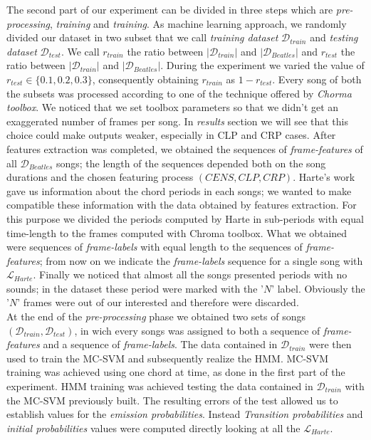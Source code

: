 The second part of our experiment can be divided in three steps which are \textit{pre-processing}, \textit{training} and \textit{training}. As machine learning approach, we randomly divided our dataset in two subset that we call \textit{training dataset} $\mathcal{D}_{train}$ and \textit{testing dataset}  $\mathcal{D}_{test}$. We call $r_{train}$ the ratio between $|\mathcal{D}_{train}|$ and $|\mathcal{D}_{Beatles}|$ and $r_{test}$ the ratio between $|\mathcal{D}_{train}|$ and $|\mathcal{D}_{Beatles}|$. During the experiment we varied the value of $r_{test} \in \{0.1,0.2,0.3\}$, consequently obtaining $r_{train}$ as $1-r_{test}$. Every song of both the subsets was processed according to one of the technique offered by \textit{Chorma toolbox}. We noticed that we set toolbox parameters so that we didn't get an exaggerated number of frames per song. In \textit{results} section we will see that this choice could make outputs weaker, especially in CLP and CRP cases. After features extraction was completed, we obtained the sequences of \textit{frame-features} of all $\mathcal{D}_{Beatles}$ songs; the length of the sequences depended both on the song durations and the chosen featuring process $(CENS,CLP,CRP)$. Harte's work gave us information about the chord periods in each songs; we wanted to make compatible these information with the data obtained by features extraction. For this purpose we divided the periods computed by Harte in sub-periods with equal time-length to the frames computed with Chroma toolbox. What we obtained were sequences of \textit{frame-labels} with equal length to the sequences of \textit{frame-features}; from now on we indicate the \textit{frame-labels} sequence for a single song with $\mathcal{L}_{Harte}$. Finally we noticed that almost all the songs presented periods with no sounds; in the dataset these period were marked with the '$N$' label. Obviously the '$N$' frames were out of our interested and therefore were discarded. \\
%
At the end of the \textit{pre-processing} phase we obtained two sets of songs $(\mathcal{D}_{train},\mathcal{D}_{test})$, in wich every songs was assigned to both a sequence of \textit{frame-features} and a sequence of \textit{frame-labels}. The data contained in $\mathcal{D}_{train}$ were then used to train the MC-SVM and subsequently realize the HMM. MC-SVM training was achieved using one chord at time, as done in the first part of the experiment. HMM training was achieved testing the data contained in $\mathcal{D}_{train}$ with the MC-SVM previously built. The resulting errors of the test allowed us to establish values for the \textit{emission probabilities}. Instead \textit{Transition probabilities} and \textit{initial probabilities} values were computed directly looking at all the $\mathcal{L}_{Harte}$. \\

